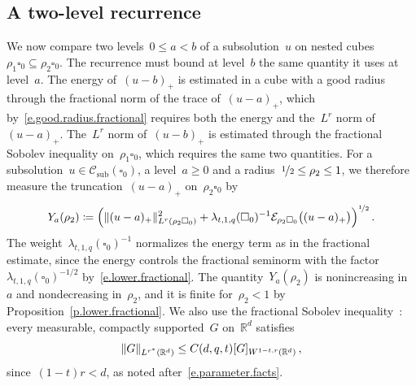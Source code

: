 \documentclass[11pt,letterpaper]{article}
\numberwithin{equation}{section}
\theoremstyle{definition}
\newcommand{\Rd}{\mathbb{R}^d}
\newcommand{\nf}{\nicefrac}
\newcommand{\cu}{\square}
\DeclarePairedDelimiter{\norm}{\lVert}{\rVert}
\renewcommand{\subset}{\subseteq}
\newcommand{\Ener}{\mathcal E}
\newcommand{\Csub}{\mathcal C_{\mathrm{sub}}}
\begin{document}
\subsection{A two-level recurrence}

We now compare two levels~$0\leq a<b$ of a subsolution~$u$ on nested cubes~$\rho_1\cu_0\subset\rho_2\cu_0$. The recurrence must bound at level~$b$ the same quantity it uses at level~$a$. The energy of~$(u-b)_+$ is estimated in a cube with a good radius through the fractional norm of the trace of~$(u-a)_+$, which by~\eqref{e.good.radius.fractional} requires both the energy and the~$L^r$ norm of~$(u-a)_+$. The~$L^r$ norm of~$(u-b)_+$ is estimated through the fractional Sobolev inequality on~$\rho_1\cu_0$, which requires the same two quantities. For a subsolution~$u\in\Csub(\cu_0)$, a level~$a\geq0$ and a radius~$\nf12\leq\rho_2\leq1$, we therefore measure the truncation~$(u-a)_+$ on~$\rho_2\cu_0$ by
\begin{equation}
	Y_a(\rho_2)\coloneqq\Bigl(\norm{(u-a)_+}_{L^r(\rho_2\cu_0)}^2+\lambda_{t,1,q}(\cu_0)^{-1}\Ener_{\rho_2\cu_0}\bigl((u-a)_+\bigr)\Bigr)^{\nf12}\,.
	\label{e.two.level.quantity}
\end{equation}
The weight~$\lambda_{t,1,q}(\cu_0)^{-1}$ normalizes the energy term as in the fractional estimate, since the energy controls the fractional seminorm with the factor~$\lambda_{t,1,q}(\cu_0)^{-1/2}$ by~\eqref{e.lower.fractional}. The quantity~$Y_a(\rho_2)$ is nonincreasing in~$a$ and nondecreasing in~$\rho_2$, and it is finite for~$\rho_2<1$ by Proposition~\ref{p.lower.fractional}. We also use the fractional Sobolev inequality~\cite[Theorem~6.5]{DNPV.fractional}: every measurable, compactly supported~$G$ on~$\Rd$ satisfies
\begin{equation}
	\norm{G}_{L^{r^*}(\Rd)}\leq C(d,q,t)[G]_{W^{1-t,r}(\Rd)}\,,
	\label{e.ordinary.fractional.sobolev}
\end{equation}
since~$(1-t)r<d$, as noted after~\eqref{e.parameter.facts}.

\smallskip
\end{document}
